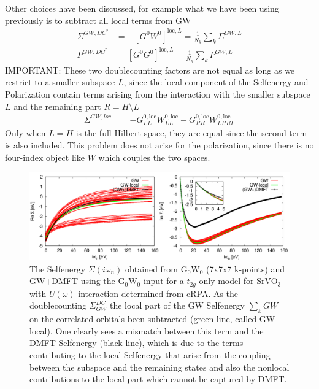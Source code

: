 \documentclass[12pt,a4paper]{scrartcl}
\numberwithin{equation}{section}
\begin{document}
Other choices have been discussed, for example what we have been using previously
is to subtract all local terms from GW
\begin{align}
\Sigma^{GW,DC^*} &= -[G^{0}W^{0}]^{\mathrm{loc},L} = \frac{1}{N_k}\sum_k \Sigma^{GW,L}  \\
P^{GW,DC^*} &= [G^{0}G^{0}]^{\mathrm{loc},L} = \frac{1}{N_k}\sum_k P^{GW,L}
\end{align}
IMPORTANT: These two doublecounting factors are not equal as long as we restrict 
to a smaller subspace $L$, since the local component of the Selfenergy and Polarization
contain terms arising from the interaction with the smaller subspace $L$
and the remaining part $R = H \setminus L$
\begin{align}
\Sigma^{GW,loc} &= -G_{LL}^{0,\mathrm{loc}}W^{0,\mathrm{loc}}_{LL}
                   -G^{0,\mathrm{loc}}_{RR}W^{0,\mathrm{loc}}_{LRRL}
\end{align}
Only when $L=H$ is the full Hilbert space, they are equal since the second term
is also included. This problem does not arise for the polarization, since
there is no four-index object like $W$ which couples the two spaces.

\begin{figure}[t]
\includegraphics[width=1.0\textwidth]{figs/sigma_loc_compare.png}
\caption{The Selfenergy $\Sigma(i\omega_n)$ obtained from G$_0$W$_0$ (7x7x7 k-points)
 and GW+DMFT using the G$_0$W$_0$ input for a $t_{2g}$-only model for SrVO$_3$ 
 with $U(\omega)$ interaction determined from cRPA. As the doublecounting
 $\Sigma_{GW}^{DC}$ the local part of the GW Selfenergy $\sum_k GW$ on the
 correlated orbitals been subtracted (green line, called GW-local).
 One clearly sees a mismatch between this term and the DMFT Selfenergy (black line),
 which is due to the terms contributing to the local Selfenergy that arise
 from the coupling between the subspace and the remaining states and 
 also the nonlocal contributions to the local part which cannot be captured by DMFT.
}
\label{fig:sigma_loc_compare}
\end{figure}
\end{document}
